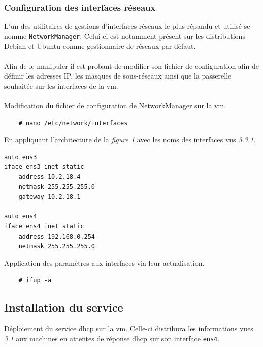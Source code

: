 \documentclass[a4paper]{article}
\begin{document}
\subsubsection{Configuration des interfaces réseaux}
L'un des utilitaires de gestions d'interfaces réseaux le plus répandu et utilisé se nomme \verb|NetworkManager|. Celui-ci est notamment présent sur les distributions Debian et Ubuntu comme gestionnaire de réseaux par défaut.\\\\Afin de le manipuler il est probant de modifier son fichier de configuration afin de définir les adresses IP, les masques de sous-réseaux ainsi que la passerelle souhaitée sur les interfaces de la \acrshort{vm}.\\\\Modification du fichier de configuration de NetworkManager sur la \acrshort{vm}.
\begin{lstlisting}
    # nano /etc/network/interfaces
\end{lstlisting}
En appliquant l'architecture de la \hyperref[sec:rzo]{\textit{figure 1}} avec les noms des interfaces vus \hyperref[sec:sec02]{\textit{3.3.1}}.
\begin{lstlisting}
auto ens3
iface ens3 inet static
    address 10.2.18.4
    netmask 255.255.255.0
    gateway 10.2.18.1
    
auto ens4
iface ens4 inet static
    address 192.168.0.254
    netmask 255.255.255.0
\end{lstlisting}
Application des paramètres aux interfaces via leur actualisation.
\begin{lstlisting}
    # ifup -a
\end{lstlisting}
\subsection{Installation du service}
Déploiement du service \gls{dhcp} sur la \acrshort{vm}. Celle-ci distribura les informations vues \hyperref[sec:dhcpe]{\textit{3.1}} aux machines en attentes de réponse \gls{dhcp} sur son interface \verb|ens4|.
\end{document}
